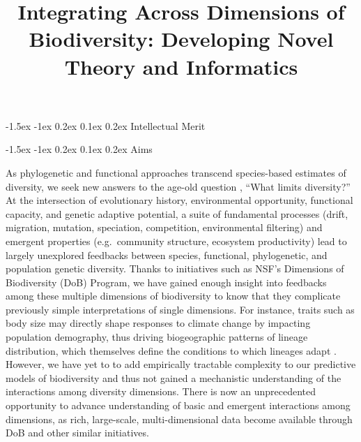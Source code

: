 \documentclass[11pt]{article}
\title{Integrating Across Dimensions of Biodiversity: Developing Novel Theory and Informatics}
\author{}
\date{}
\makeatletter
\renewcommand\section{\@startsection{section}{1}{\z@}%
                                  {-1.5ex \@plus -1ex \@minus 0.2ex}%
                                  {0.1ex \@plus 0.2ex}%
                                  {\normalfont\Large\bfseries}}
\renewcommand\subsection{\@startsection{subsection}{1}{\z@}%
                                  {-1.5ex \@plus -1ex \@minus 0.2ex}%
                                  {0.1ex \@plus 0.2ex}%
                                  {\normalfont\large\bfseries}}
\makeatother
\begin{document}
\maketitle
\vspace{-6em}

\section{Intellectual Merit}\label{intellectual-merit}

\subsection{Aims}\label{aims}

As phylogenetic and functional approaches transcend species-based
estimates of diversity, we seek new answers to the age-old question
\cite{Hutchinson1959-ob}, ``What limits diversity?'' At the
intersection of evolutionary history, environmental opportunity,
functional capacity, and genetic adaptive potential, a suite of
fundamental processes (drift, migration, mutation, speciation,
competition, environmental filtering) and emergent properties
(e.g.~community structure, ecosystem productivity) lead to largely
unexplored feedbacks between species, functional, phylogenetic, and
population genetic diversity. Thanks to initiatives such as NSF's
Dimensions of Biodiversity (DoB) Program, we have gained enough
insight into feedbacks among these multiple dimensions of biodiversity
to know that they complicate previously simple interpretations of
single dimensions. For instance, traits such as body size may directly
shape responses to climate change by impacting population demography,
thus driving biogeographic patterns of lineage distribution, which
themselves define the conditions to which lineages adapt
\cite{Prates2016-gr,Carnaval2014-je}. However, we have yet to to add
empirically tractable 
complexity to our predictive models of biodiversity and thus not
gained a mechanistic understanding of the interactions among diversity
dimensions. There is now an unprecedented opportunity to advance
understanding of basic and emergent interactions among dimensions, as
rich, large-scale, multi-dimensional data
become available through DoB and other similar initiatives.
\end{document}
